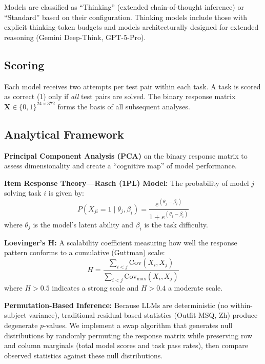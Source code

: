 \documentclass[11pt, letterpaper]{article}
\begin{document}
Models are classified as ``Thinking'' (extended chain-of-thought inference) or ``Standard'' based on their configuration. Thinking models include those with explicit thinking-token budgets and models architecturally designed for extended reasoning (Gemini Deep-Think, GPT-5-Pro).

\subsection{Scoring}

Each model receives two attempts per test pair within each task. A task is scored as correct (1) only if \textit{all} test pairs are solved. The binary response matrix $\mathbf{X} \in \{0,1\}^{24 \times 372}$ forms the basis of all subsequent analyses.

\subsection{Analytical Framework}

\textbf{Principal Component Analysis (PCA)} on the binary response matrix to assess dimensionality and create a ``cognitive map'' of model performance.

\textbf{Item Response Theory---Rasch (1PL) Model:} The probability of model $j$ solving task $i$ is given by:
\begin{equation}
    P(X_{ji} = 1 \mid \theta_j, \beta_i) = \frac{e^{(\theta_j - \beta_i)}}{1 + e^{(\theta_j - \beta_i)}}
\end{equation}
where $\theta_j$ is the model's latent ability and $\beta_i$ is the task difficulty.

\textbf{Loevinger's H:} A scalability coefficient measuring how well the response pattern conforms to a cumulative (Guttman) scale:
\begin{equation}
    H = \frac{\sum_{i<j} \text{Cov}(X_i, X_j)}{\sum_{i<j} \text{Cov}_{\max}(X_i, X_j)}
\end{equation}
where $H > 0.5$ indicates a strong scale and $H > 0.4$ a moderate scale.

\textbf{Permutation-Based Inference:} Because LLMs are deterministic (no within-subject variance), traditional residual-based statistics (Outfit MSQ, Zh) produce degenerate $p$-values. We implement a swap algorithm that generates null distributions by randomly permuting the response matrix while preserving row and column marginals (total model scores and task pass rates), then compare observed statistics against these null distributions.
\end{document}
